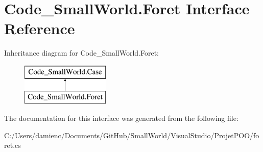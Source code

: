 \hypertarget{interface_code___small_world_1_1_foret}{\section{Code\-\_\-\-Small\-World.\-Foret Interface Reference}
\label{interface_code___small_world_1_1_foret}
}
Inheritance diagram for Code\-\_\-\-Small\-World.\-Foret\-:\begin{figure}[H]
\begin{center}
\leavevmode
\includegraphics[height=2.000000cm]{interface_code___small_world_1_1_foret}
\end{center}
\end{figure}


The documentation for this interface was generated from the following file\-:\begin{DoxyCompactItemize}
\item 
C\-:/\-Users/damienc/\-Documents/\-Git\-Hub/\-Small\-World/\-Visual\-Studio/\-Projet\-P\-O\-O/foret.\-cs\end{DoxyCompactItemize}
